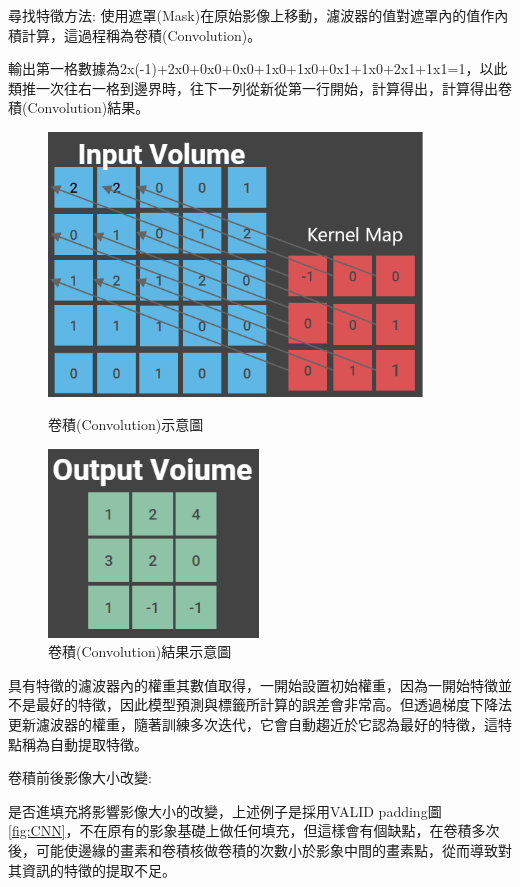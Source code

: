 尋找特徵方法:
使用遮罩(Mask)在原始影像上移動，濾波器的值對遮罩內的值作內積計算，這過程稱為卷積(Convolution)。


輸出第一格數據為2x(-1)+2x0+0x0+0x0+1x0+1x0+0x1+1x0+2x1+1x1=1，以此類推一次往右一格到邊界時，往下一列從新從第一行開始，計算得出，計算得出卷積(Convolution)結果。


\begin{figure}[H]
	\centerline{\includegraphics[height=7cm]{pic/CNN1.png}}
	\caption{卷積(Convolution)示意圖}
	\label{fig:CNN}

	\centerline{\includegraphics[height=5cm]{pic/CNN2.PNG}}
	\caption{卷積(Convolution)結果示意圖}
	\label{fig:CNN finally}
\end{figure}



具有特徵的濾波器內的權重其數值取得，一開始設置初始權重，因為一開始特徵並不是最好的特徵，因此模型預測與標籤所計算的誤差會非常高。但透過梯度下降法更新濾波器的權重，隨著訓練多次迭代，它會自動趨近於它認為最好的特徵，這特點稱為自動提取特徵。

卷積前後影像大小改變:

是否進填充將影響影像大小的改變，上述例子是採用VALID padding圖\ref{fig:CNN}，不在原有的影象基礎上做任何填充，但這樣會有個缺點，在卷積多次後，可能使邊緣的畫素和卷積核做卷積的次數小於影象中間的畫素點，從而導致對其資訊的特徵的提取不足。

